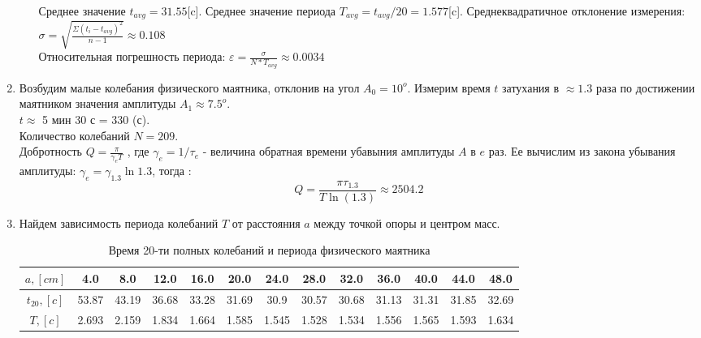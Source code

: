 \documentclass[12pt]{article}
\begin{document}
\begin{enumerate}
\begin{enumerate}
            Среднее значение $t_{avg} = 31.55$[c]. Среднее значение периода $T_{avg} = t_{avg}/20 = 1.577$[c].
            Среднеквадратичное отклонение измерения:
            $\sigma = \sqrt{\frac{\Sigma (t_i - t_{avg})^2 }{n-1}} \approx 0.108$ \\
            Относительная погрешность периода: $\varepsilon = \frac{\sigma}{N* T_{avg}} \approx 0.0034$ \\  
        \end{enumerate}
        \item Возбудим малые колебания физического маятника, отклонив на угол $A_0 = 10^o$. Измерим время $t$ затухания в $\approx 1.3$ раза по достижении маятником значения амплитуды $A_1 \approx 7.5^o$. \\
        $t \approx$ 5 мин 30 с = 330 (с). \\
        Количество колебаний $N = 209$.\\
        Добротность $Q = \frac{\pi}{\gamma_{e}T}$ , где $\gamma_{e} = 1 / \tau_{e}$ - величина обратная времени убавыния амплитуды $A$ в $e$ раз. Ее вычислим из закона убывания амплитуды: $\gamma_{e} = \gamma_{1.3} \ln{1.3}$, тогда :\\
        \begin{equation}
            Q = \frac{\pi \tau_{1.3}}{T \ln(1.3)} \approx 2504.2
        \end{equation}
        \item Найдем зависимость периода колебаний $T$ от расстояния $a$ между точкой опоры и центром масс.
        \begin{table}[h]
                    \caption{Время 20-ти полных колебаний и периода физического маятника}
                    \begin{center}
                    \begin{tabular}{|c|c|c|c|c|c|c|c|c|c|c|c|c|}
                            \hline 
                                $a,[cm]$ & 4.0& 8.0& 12.0& 16.0& 20.0& 24.0& 28.0& 32.0& 36.0& 40.0& 44.0& 48.0 \\

                            \hline
                                $t_{20},[c]$ & 53.87& 43.19& 36.68& 33.28& 31.69& 30.9& 30.57& 30.68& 31.13& 31.31& 31.85& 32.69 \\
                            \hline
                                $T,[c]$ & 2.693& 2.159& 1.834& 1.664& 1.585& 1.545& 1.528& 1.534& 1.556& 1.565& 1.593& 1.634\\
                            \hline
                    \end{tabular}
                    \end{center}
        \end{table}


\end{enumerate}
\end{document}
